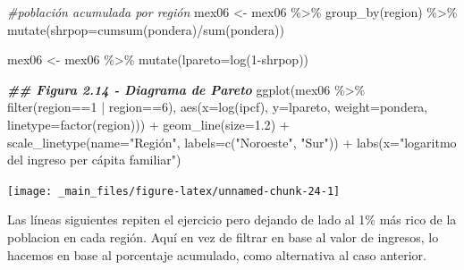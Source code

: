 \documentclass[
]{book}
\newenvironment{Shaded}{\begin{snugshade}}{\end{snugshade}}
\newcommand{\AttributeTok}[1]{\textcolor[rgb]{0.77,0.63,0.00}{#1}}
\newcommand{\CommentTok}[1]{\textcolor[rgb]{0.56,0.35,0.01}{\textit{#1}}}
\newcommand{\DecValTok}[1]{\textcolor[rgb]{0.00,0.00,0.81}{#1}}
\newcommand{\DocumentationTok}[1]{\textcolor[rgb]{0.56,0.35,0.01}{\textbf{\textit{#1}}}}
\newcommand{\FloatTok}[1]{\textcolor[rgb]{0.00,0.00,0.81}{#1}}
\newcommand{\FunctionTok}[1]{\textcolor[rgb]{0.00,0.00,0.00}{#1}}
\newcommand{\NormalTok}[1]{#1}
\newcommand{\OtherTok}[1]{\textcolor[rgb]{0.56,0.35,0.01}{#1}}
\newcommand{\SpecialCharTok}[1]{\textcolor[rgb]{0.00,0.00,0.00}{#1}}
\newcommand{\StringTok}[1]{\textcolor[rgb]{0.31,0.60,0.02}{#1}}
\begin{document}
\begin{Shaded}
\begin{Highlighting}[]
\CommentTok{\#población acumulada por región}
\NormalTok{mex06 }\OtherTok{\textless{}{-}}\NormalTok{ mex06 }\SpecialCharTok{\%\textgreater{}\%} \FunctionTok{group\_by}\NormalTok{(region) }\SpecialCharTok{\%\textgreater{}\%} \FunctionTok{mutate}\NormalTok{(}\AttributeTok{shrpop=}\FunctionTok{cumsum}\NormalTok{(pondera)}\SpecialCharTok{/}\FunctionTok{sum}\NormalTok{(pondera)) }

\NormalTok{mex06 }\OtherTok{\textless{}{-}}\NormalTok{ mex06 }\SpecialCharTok{\%\textgreater{}\%} \FunctionTok{mutate}\NormalTok{(}\AttributeTok{lpareto=}\FunctionTok{log}\NormalTok{(}\DecValTok{1}\SpecialCharTok{{-}}\NormalTok{shrpop)) }

\DocumentationTok{\#\# Figura 2.14 {-} Diagrama de Pareto}
\FunctionTok{ggplot}\NormalTok{(mex06 }\SpecialCharTok{\%\textgreater{}\%} \FunctionTok{filter}\NormalTok{(region}\SpecialCharTok{==}\DecValTok{1} \SpecialCharTok{|}\NormalTok{ region}\SpecialCharTok{==}\DecValTok{6}\NormalTok{), }
       \FunctionTok{aes}\NormalTok{(}\AttributeTok{x=}\FunctionTok{log}\NormalTok{(ipcf), }\AttributeTok{y=}\NormalTok{lpareto, }\AttributeTok{weight=}\NormalTok{pondera, }\AttributeTok{linetype=}\FunctionTok{factor}\NormalTok{(region))) }\SpecialCharTok{+} 
  \FunctionTok{geom\_line}\NormalTok{(}\AttributeTok{size=}\FloatTok{1.2}\NormalTok{) }\SpecialCharTok{+}
  \FunctionTok{scale\_linetype}\NormalTok{(}\AttributeTok{name=}\StringTok{"Región"}\NormalTok{, }\AttributeTok{labels=}\FunctionTok{c}\NormalTok{(}\StringTok{"Noroeste"}\NormalTok{, }\StringTok{"Sur"}\NormalTok{)) }\SpecialCharTok{+} 
  \FunctionTok{labs}\NormalTok{(}\AttributeTok{x=}\StringTok{"logaritmo del ingreso per cápita familiar"}\NormalTok{)}
\end{Highlighting}
\end{Shaded}

\texttt{[image: \_main\_files/figure-latex/unnamed-chunk-24-1]}

Las líneas siguientes repiten el ejercicio pero dejando de lado al 1\% más rico de la poblacion en cada región. Aquí en vez de filtrar en base al valor de ingresos, lo hacemos en base al porcentaje acumulado, como alternativa al caso anterior.
\end{document}
